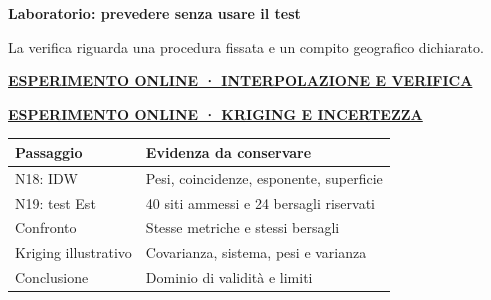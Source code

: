 \documentclass[12pt,aspectratio=1610]{beamer}
\newcommand{\PLab}[2]{\par{\color{Classical}\bfseries\fontsize{9}{11}\selectfont
\href{#1}{\MakeUppercase{#2}}}\par\vspace{1.8mm}}
\begin{document}
\begin{frame}[plain]\hypertarget{slide105}{}
\begin{lrbox}{\TitleBox}
\begin{minipage}[t]{17.7cm}\raggedright\color{Ink}\fontsize{11.3}{14.8}\selectfont
\color{Navy}\bfseries\fontsize{20.6}{24.5}\selectfont Laboratorio: prevedere senza usare il test
\end{minipage}\end{lrbox}

\begin{lrbox}{\RecallBox}
\begin{minipage}[t]{14.3cm}\raggedright\color{Ink}\fontsize{11.3}{14.8}\selectfont
\fontsize{10.3}{13.8}\selectfont La verifica riguarda una procedura fissata e un compito geografico dichiarato.
\end{minipage}\end{lrbox}

\begin{lrbox}{\PilotLeftBox}
\begin{minipage}[t]{10.05cm}\raggedright\color{Ink}\fontsize{11.3}{14.8}\selectfont
\PLab{https://marzione00.github.io/Lab_Geo/\#laboratorio/m11-interpolazione}{Esperimento online · interpolazione e verifica}
\PLab{https://marzione00.github.io/Lab_Geo/\#laboratorio/m11-kriging}{Esperimento online · kriging e incertezza}
{\fontsize{10.2}{13.1}\selectfont\renewcommand{\arraystretch}{1.45}\begin{tabular}{@{}p{3.7cm}p{5.3cm}@{}}\toprule
\textbf{Passaggio} & \textbf{Evidenza da conservare}\\\midrule
N18: IDW & Pesi, coincidenze, esponente, superficie\\
N19: test Est & 40 siti ammessi e 24 bersagli riservati\\
Confronto & Stesse metriche e stessi bersagli\\
Kriging illustrativo & Covarianza, sistema, pesi e varianza\\
Conclusione & Dominio di validità e limiti\\
\bottomrule\end{tabular}}

\end{minipage}\end{lrbox}


\end{frame}
\end{document}
